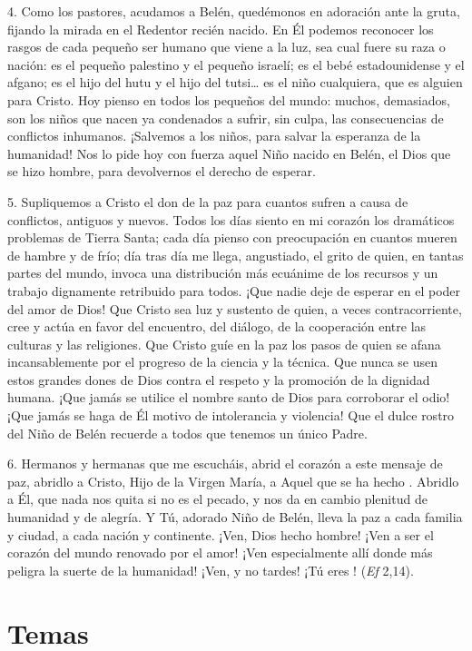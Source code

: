 \begin{body}
	4. Como los pastores, acudamos a Belén, quedémonos en adoración ante la gruta, fijando la mirada en el Redentor recién nacido. En Él podemos reconocer los rasgos de cada pequeño ser humano que viene a la luz, sea cual fuere su raza o nación: es el pequeño palestino y el pequeño israelí; es el bebé estadounidense y el afgano; es el hijo del hutu y el hijo del tutsi\ldots{} es el niño cualquiera, que es alguien para Cristo. Hoy pienso en todos los pequeños del mundo: muchos, demasiados, son los niños que nacen ya condenados a sufrir, sin culpa, las consecuencias de conflictos inhumanos. ¡Salvemos a los niños, para salvar la esperanza de la humanidad! Nos lo pide hoy con fuerza aquel Niño nacido en Belén, el Dios que se hizo hombre, para devolvernos el derecho de esperar.
	
	5. Supliquemos a Cristo el don de la paz para cuantos sufren a causa de conflictos, antiguos y nuevos. Todos los días siento en mi corazón los dramáticos problemas de Tierra Santa; cada día pienso con preocupación en cuantos mueren de hambre y de frío; día tras día me llega, angustiado, el grito de quien, en tantas partes del mundo, invoca una distribución más ecuánime de los recursos y un trabajo dignamente retribuido para todos. ¡Que nadie deje de esperar en el poder del amor de Dios! Que Cristo sea luz y sustento de quien, a veces contracorriente, cree y actúa en favor del encuentro, del diálogo, de la cooperación entre las culturas y las religiones. Que Cristo guíe en la paz los pasos de quien se afana incansablemente por el progreso de la ciencia y la técnica. Que nunca se usen estos grandes dones de Dios contra el respeto y la promoción de la dignidad humana. ¡Que jamás se utilice el nombre santo de Dios para corroborar el odio! ¡Que jamás se haga de Él motivo de intolerancia y violencia! Que el dulce rostro del Niño de Belén recuerde a todos que tenemos un único Padre.
	
	6.  Hermanos y hermanas que me escucháis, abrid el corazón a este mensaje de paz, abridlo a Cristo, Hijo de la Virgen María, a Aquel que se ha hecho . Abridlo a Él, que nada nos quita si no es el pecado, y nos da en cambio plenitud de humanidad y de alegría. Y Tú, adorado Niño de Belén, lleva la paz a cada familia y ciudad, a cada nación y continente. ¡Ven, Dios hecho hombre! ¡Ven a ser el corazón del mundo renovado por el amor! ¡Ven especialmente allí donde más peligra la suerte de la humanidad! ¡Ven, y no tardes! ¡Tú eres ! (\emph{Ef} 2,14).
\end{body}


\newsection

\section{Temas}\label{navidad_temas}



